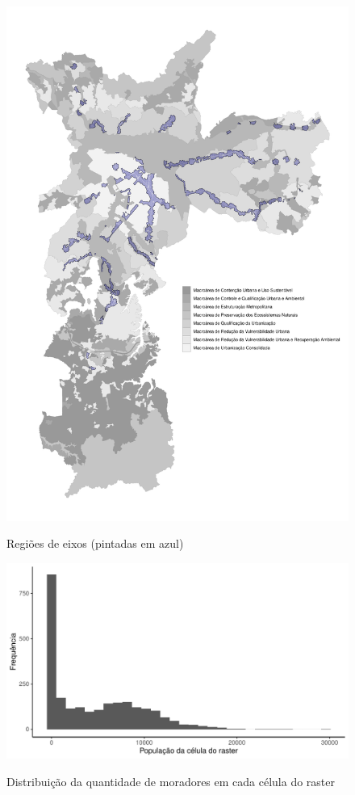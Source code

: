 \begin{apendicesenv}
\begin{figure}[!h]
    \centering
    \caption{Regiões de eixos (pintadas em azul)}
    \includegraphics[width = .85\linewidth]{figuras/macroareas-eixos.pdf}
    \label{fig:eixos}
\end{figure}

\clearpage

\begin{figure}[!h]
    \centering
    \caption{Distribuição da quantidade de moradores em cada célula do raster}
    \includegraphics[width = .85\linewidth]{figuras/populacao-distribuicao-raster.pdf}
    \label{fig:populacao-rasters}
\end{figure}






\end{apendicesenv}
    
    